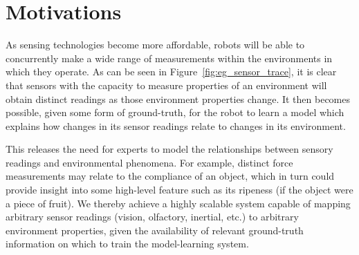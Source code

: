 
\section{Motivations}
As sensing technologies become more affordable, robots will be able to concurrently make a wide range of measurements within the environments in which they operate.  
As can be seen in Figure~\ref{fig:eg_sensor_trace}, it is clear that sensors with the capacity to measure properties of an environment will obtain distinct readings as those environment properties change.
It then becomes possible, given some form of ground-truth, for the robot to learn a model which explains how changes in its sensor readings relate to changes in its environment.


This releases the need for experts to model the relationships between sensory readings and environmental phenomena. 
For example, distinct force measurements may relate to the compliance of an object, which in turn could provide insight into some high-level feature such as its ripeness (if the object were a piece of fruit).
We thereby achieve a highly scalable system capable of mapping arbitrary sensor readings (vision, olfactory, inertial, etc.) to arbitrary environment properties, given the availability of relevant ground-truth information on which to train the model-learning system.

